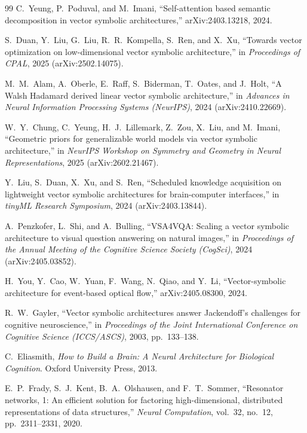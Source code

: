 \documentclass[11pt]{article}
\begin{document}
\begin{thebibliography}{99}
C.~Yeung, P.~Poduval, and M.~Imani, ``Self-attention based semantic decomposition in vector symbolic architectures,'' arXiv:2403.13218, 2024.

S.~Duan, Y.~Liu, G.~Liu, R.~R.~Kompella, S.~Ren, and X.~Xu, ``Towards vector optimization on low-dimensional vector symbolic architecture,'' in \textit{Proceedings of CPAL}, 2025 (arXiv:2502.14075).

M.~M.~Alam, A.~Oberle, E.~Raff, S.~Biderman, T.~Oates, and J.~Holt, ``A Walsh Hadamard derived linear vector symbolic architecture,'' in \textit{Advances in Neural Information Processing Systems (NeurIPS)}, 2024 (arXiv:2410.22669).

W.~Y.~Chung, C.~Yeung, H.~J.~Lillemark, Z.~Zou, X.~Liu, and M.~Imani, ``Geometric priors for generalizable world models via vector symbolic architecture,'' in \textit{NeurIPS Workshop on Symmetry and Geometry in Neural Representations}, 2025 (arXiv:2602.21467).

Y.~Liu, S.~Duan, X.~Xu, and S.~Ren, ``Scheduled knowledge acquisition on lightweight vector symbolic architectures for brain-computer interfaces,'' in \textit{tinyML Research Symposium}, 2024 (arXiv:2403.13844).

A.~Penzkofer, L.~Shi, and A.~Bulling, ``VSA4VQA: Scaling a vector symbolic architecture to visual question answering on natural images,'' in \textit{Proceedings of the Annual Meeting of the Cognitive Science Society (CogSci)}, 2024 (arXiv:2405.03852).

H.~You, Y.~Cao, W.~Yuan, F.~Wang, N.~Qiao, and Y.~Li, ``Vector-symbolic architecture for event-based optical flow,'' arXiv:2405.08300, 2024.

R.~W.~Gayler, ``Vector symbolic architectures answer Jackendoff's challenges for cognitive neuroscience,'' in \textit{Proceedings of the Joint International Conference on Cognitive Science (ICCS/ASCS)}, 2003, pp.~133--138.

C.~Eliasmith, \textit{How to Build a Brain: A Neural Architecture for Biological Cognition}. Oxford University Press, 2013.

E.~P.~Frady, S.~J.~Kent, B.~A.~Olshausen, and F.~T.~Sommer, ``Resonator networks, 1: An efficient solution for factoring high-dimensional, distributed representations of data structures,'' \textit{Neural Computation}, vol.~32, no.~12, pp.~2311--2331, 2020.


\end{thebibliography}
\end{document}
